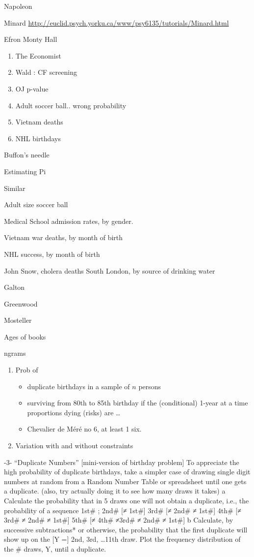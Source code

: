 \documentclass[]{book}
\providecommand{\tightlist}{%
  \setlength{\itemsep}{0pt}\setlength{\parskip}{0pt}}
\begin{document}
Napoleon

Minard
\url{http://euclid.psych.yorku.ca/www/psy6135/tutorials/Minard.html}

Efron Monty Hall

\begin{enumerate}
\def\labelenumi{\arabic{enumi}.}
\setcounter{enumi}{6}
\item
  The Economist
\item
  Wald : CF screening
\item
  OJ p-value
\item
  Adult soccer ball.. wrong probability
\item
  Vietnam deaths
\item
  NHL birthdays
\end{enumerate}

Buffon's needle

Estimating Pi

Similar

Adult size soccer ball

Medical School admission rates, by gender.

Vietnam war deaths, by month of birth

NHL success, by month of birth

John Snow, cholera deaths South London, by source of drinking water

Galton

Greenwood

Mosteller

Ages of books

ngrams

\begin{enumerate}
\def\labelenumi{\arabic{enumi}.}
\setcounter{enumi}{3}
\item
  Prob of

  \begin{itemize}
  \tightlist
  \item
    duplicate birthdays in a sample of \(n\) persons
  \item
    surviving from 80th to 85th birthday if the (conditional) 1-year at a time proportions dying (risks) are \ldots{}
  \item
    Chevalier de Méré no 6, at least 1 six.
  \end{itemize}
\item
  Variation with and without constraints
\end{enumerate}

-3- ``Duplicate Numbers'' {[}mini-version of birthday problem{]}
To appreciate the high probability of duplicate birthdays, take a simpler case of drawing single digit numbers at random from a Random Number Table or spreadsheet until one gets a duplicate. (also, try actually doing it to see how many draws it takes)
a Calculate the probability that in 5 draws one will not obtain a duplicate, i.e., the probability of a sequence
1st\# ;
2nd\# {[}≠ 1st\#{]}
3rd\# {[}≠ 2nd\# ≠ 1st\#{]}
4th\# {[}≠ 3rd\# ≠ 2nd\# ≠ 1st\#{]}
5th\# {[}≠ 4th\# ≠3rd\# ≠ 2nd\# ≠ 1st\#{]}
b Calculate, by successive subtractions* or otherwise, the probability that the first duplicate will show up on the {[}Y ={]} 2nd, 3rd, \ldots{}11th draw. Plot the frequency distribution of the \# draws, Y, until a duplicate.
\end{document}
